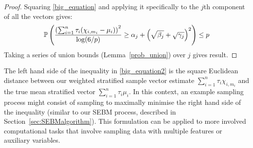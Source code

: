 \begin{theorem}

\end{theorem}
\begin{proof}
Squaring \eqref{big_equation} and applying it specifically to the $j$th component of all the vectors gives:
\begin{equation*}
\operatorname{\mathbb{P}}\left(\frac{\left(\sum_{i=1}^n\tau_i(\chi_{i,m_i}-\mu_i)\right)^2}{\log(6/p)} 
\ge \alpha_{j} 
+ \left(\sqrt{\beta_{j}} 
+ \sqrt{\gamma_{j}}\right)^2  \right)
\le p 
\end{equation*}
Taking a series of union bounds (Lemma~\ref{prob_union}) over $j$ gives result.
\end{proof}

The left hand side of the inequality in \eqref{big_equation2} is the square Euclidean distance between our weighted stratified sample vector estimate $\sum_{i=1}^n\tau_i\chi_{i,m_i}$ and the true mean stratified vector $\sum_{i=1}^n\tau_i\mu_{i}$.
In this context, an example sampling process might consist of sampling to maximally minimise the right hand side of the inequality (similar to our SEBM process, described in Section~\ref{sec:SEBMalgorithm}).
This formulation can be applied to more involved computational tasks that involve sampling data with multiple features or auxiliary variables.








